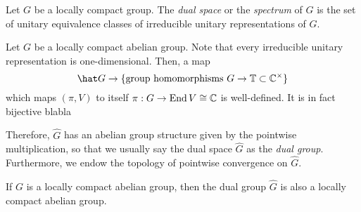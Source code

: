 \documentclass[12pt]{article}
\begin{document}
\begin{defn}
Let $G$ be a locally compact group.
The \emph{dual space} or the \emph{spectrum} of $G$ is the set of unitary equivalence classes of irreducible unitary representations of $G$. 
\end{defn}
\begin{defn}
Let $G$ be a locally compact abelian group.
Note that every irreducible unitary representation is one-dimensional.
Then, a map
\[\hat G\to\{\text{group homomorphisms }G\to\T\subset\C^\times\}\]
which maps $(\pi,V)$ to itself $\pi:G\to\operatorname{End}{V}\cong\mathbb{C}$ is well-defined.
It is in fact bijective blabla

Therefore, $\hat G$ has an abelian group structure given by the pointwise multiplication, so that we usually say the dual space $\hat G$ as the \emph{dual group}.
Furthermore, we endow the topology of pointwise convergence on $\hat G$.
\end{defn}
\begin{prop}
If $G$ is a locally compact abelian group, then the dual group $\hat G$ is also a locally compact abelian group.
\end{prop}

\begin{ex}
\end{ex}




\end{document}
